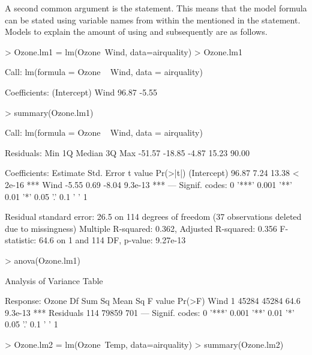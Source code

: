 A second common argument is the  statement. This means that the model formula can be stated using variable names from within the  mentioned in the  statement. Models to explain the amount of  using  and subsequently  are as follows. 
\begin{Schunk}
\begin{Sinput}
> Ozone.lm1 = lm(Ozone~Wind, data=airquality) 
> Ozone.lm1 
\end{Sinput}
\begin{Soutput}

Call:
lm(formula = Ozone ~ Wind, data = airquality)

Coefficients:
(Intercept)         Wind  
      96.87        -5.55  
\end{Soutput}
\begin{Sinput}
> summary(Ozone.lm1) 
\end{Sinput}
\begin{Soutput}

Call:
lm(formula = Ozone ~ Wind, data = airquality)

Residuals:
   Min     1Q Median     3Q    Max 
-51.57 -18.85  -4.87  15.23  90.00 

Coefficients:
            Estimate Std. Error t value Pr(>|t|)    
(Intercept)    96.87       7.24   13.38  < 2e-16 ***
Wind           -5.55       0.69   -8.04  9.3e-13 ***
---
Signif. codes:  
0 '***' 0.001 '**' 0.01 '*' 0.05 '.' 0.1 ' ' 1

Residual standard error: 26.5 on 114 degrees of freedom
  (37 observations deleted due to missingness)
Multiple R-squared:  0.362,	Adjusted R-squared:  0.356 
F-statistic: 64.6 on 1 and 114 DF,  p-value: 9.27e-13
\end{Soutput}
\begin{Sinput}
> anova(Ozone.lm1) 
\end{Sinput}
\begin{Soutput}
Analysis of Variance Table

Response: Ozone
           Df Sum Sq Mean Sq F value  Pr(>F)    
Wind        1  45284   45284    64.6 9.3e-13 ***
Residuals 114  79859     701                    
---
Signif. codes:  
0 '***' 0.001 '**' 0.01 '*' 0.05 '.' 0.1 ' ' 1
\end{Soutput}
\begin{Sinput}
> Ozone.lm2 = lm(Ozone~Temp, data=airquality) 
> summary(Ozone.lm2) 
\end{Sinput}
\begin{Soutput}


\end{Soutput}
\end{Schunk}

